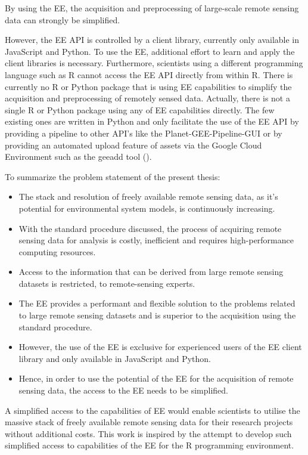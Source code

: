 By using the EE, the acquisition and preprocessing of large-scale remote sensing data can strongly be simplified.

However, the EE API is controlled by a client library, currently only available in JavaScript and Python. To use the EE, additional effort to learn and apply the client libraries is necessary. Furthermore, scientists using a different programming language such as R cannot access the EE API directly from within R.
There is currently no R or Python package that is using EE capabilities to simplify the acquisition and preprocessing of remotely sensed data. Actually, there is not a single R or Python package using any of EE capabilities directly. The few existing ones are written in Python and only facilitate the use of the EE API by providing a pipeline to other API's like the Planet-GEE-Pipeline-GUI or by providing an automated upload feature of assets via the Google Cloud Environment such as the geeadd tool (\cite{roy2017google}).

\newpage
To summarize the problem statement of the present thesis:

\begin{itemize}
	
	\item The stack and resolution of freely available remote sensing data, as it's potential for environmental system models, is continuously increasing.
	\item With the standard procedure discussed, the process of acquiring remote sensing data for analysis is costly, inefficient and requires high-performance computing resources.
	\item Access to the information that can be derived from large remote sensing datasets is restricted, to remote-sensing experts.
	\item The EE provides a performant and flexible solution to the problems related to large remote sensing datasets and is superior to the acquisition using the standard procedure.
	\item However, the use of the EE is exclusive for experienced users of the EE client library and only available in JavaScript and Python.
	\item Hence, in order to use the potential of the EE for the acquisition of remote sensing data, the access to the EE needs to be simplified.
	
\end{itemize}

A simplified access to the capabilities of EE would enable scientists to utilise the massive stack of freely available remote sensing data for their research projects without additional costs. This work is inspired by the attempt to develop such simplified access to capabilities of the EE for the R programming environment.

